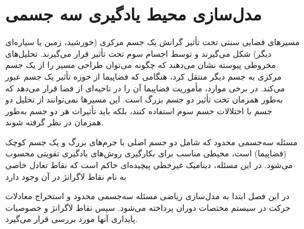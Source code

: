 %
%
%
%
%












\chapter{مدل‌سازی محیط یادگیری سه‌ جسمی}

مسیرهای فضایی سنتی تحت تأثیر گرانش یک جسم مرکزی (خورشید، زمین یا سیاره‌ای دیگر) شکل می‌گیرند و توسط اجسام سوم تحت تأثیر قرار می‌گیرند. تحلیل‌های مخروطی پیوسته نشان می‌دهند که چگونه می‌توان طراحی مسیر را از یک جسم مرکزی به جسم دیگر منتقل کرد، هنگامی که فضاپیما از حوزه تأثیر یک جسم عبور می‌کند. در برخی موارد، مأموریت فضاپیما آن را در ناحیه‌ای از فضا قرار می‌دهد که به‌طور همزمان تحت تأثیر دو جسم بزرگ است. این مسیرها نمی‌توانند از تحلیل دو جسم با اختلالات جسم سوم استفاده کنند، بلکه باید تأثیرات هر دو جسم به‌طور همزمان در نظر گرفته شوند.

مسئله سه‌جسمی محدود که شامل دو جسم اصلی با جرم‌های بزرگ و یک جسم کوچک (فضاپیما) است، محیطی مناسب برای بکارگیری روش‌های یادگیری تقویتی محسوب می‌شود. در این مسئله، دینامیک غیرخطی پیچیده‌ای حاکم است که نقاط تعادل خاصی به نام نقاط لاگرانژ در آن وجود دارد

در این فصل ابتدا به مدل‌سازی ریاضی مسئله سه‌جسمی محدود و استخراج معادلات حرکت در سیستم مختصات دوران پرداخته می‌شود. سپس نقاط لاگرانژ و خصوصیات پایداری آنها مورد بررسی قرار می‌گیرد. 









